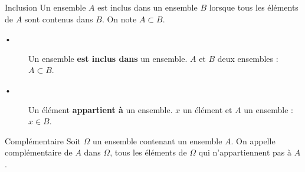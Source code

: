 

%
%
%
%
%
%
%
%
%
%
%

\begin{DefT}{Inclusion}
Un ensemble $A$ est inclus dans un ensemble $B$ lorsque tous les éléments de $A$ sont contenus dans $B$. On note $A \subset B$.
\end{DefT}


\begin{Rq}
\begin{description}
\item[•] Un ensemble \textbf{est inclus dans} un ensemble. $A$ et $B$ deux ensembles : $A \subset B$.
\item[•] Un élément \textbf{appartient à} un ensemble. $x$ un élément et $A$ un ensemble : $x \in B$.
\end{description}
\end{Rq}


\begin{DefT}{Complémentaire}
Soit $\Omega$ un ensemble contenant un ensemble $A$. On appelle complémentaire de $A$ dans $\Omega$, tous les éléments de $\Omega$ qui n'appartiennent pas à $A$.
\end{DefT}


%
